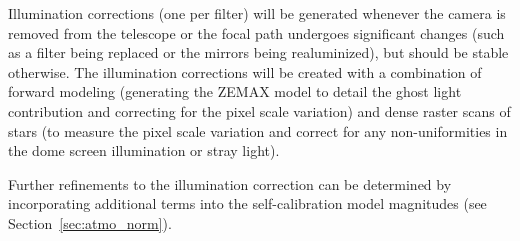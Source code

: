 \documentclass[12pt,preprint]{aastex}
\begin{document}
Illumination corrections (one per filter) will be generated whenever
the camera is removed from the telescope or the focal path undergoes
significant changes (such as a filter being replaced or the mirrors
being realuminized), but should be stable otherwise. The illumination
corrections will be created with a combination of forward modeling
(generating the ZEMAX model to detail the ghost light contribution and
correcting for the pixel scale variation) and dense raster scans of
stars (to measure the pixel scale variation and correct for any
non-uniformities in the dome screen illumination or stray light).

Further refinements to the illumination correction can be determined
by incorporating additional terms into the self-calibration model
magnitudes (see Section~\ref{sec:atmo_norm}).
\end{document}
